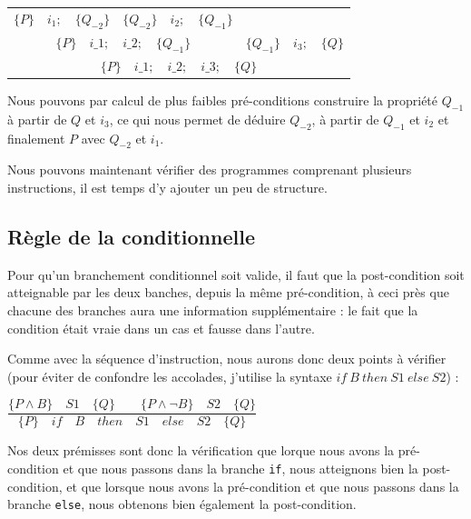 \documentclass[12pt,francais,]{scrbook}
\begin{document}
\begin{center}
\begin{tabular}{ccc}
  $\{P\}\quad i_1 ; \quad \{Q_{-2}\}$ & $\{Q_{-2}\}\quad i_2 ; \quad \{Q_{-1}\}$ & \\
  \cline{1-2}
  \multicolumn{2}{c}{$\{P\}\quad i\_1 ; \quad i\_2 ; \quad \{Q_{-1}\}$} & $\{Q_{-1}\} \quad i_3 ; \quad \{Q\}$\\
  \hline
  \multicolumn{3}{c}{$\{P\}\quad i\_1 ; \quad i\_2 ; \quad i\_3; \quad \{ Q \}$}
\end{tabular}
\end{center}

Nous pouvons par calcul de plus faibles pré-conditions construire la
propriété \(Q_{-1}\) à partir de \(Q\) et \(i_3\), ce qui nous permet de
déduire \(Q_{-2}\), à partir de \(Q_{-1}\) et \(i_2\) et finalement
\(P\) avec \(Q_{-2}\) et \(i_1\).

Nous pouvons maintenant vérifier des programmes comprenant plusieurs
instructions, il est temps d'y ajouter un peu de structure.

\subsection{Règle de la
conditionnelle}\label{ruxe8gle-de-la-conditionnelle}

Pour qu'un branchement conditionnel soit valide, il faut que la
post-condition soit atteignable par les deux banches, depuis la même
pré-condition, à ceci près que chacune des branches aura une information
supplémentaire : le fait que la condition était vraie dans un cas et
fausse dans l'autre.

Comme avec la séquence d'instruction, nous aurons donc deux points à
vérifier (pour éviter de confondre les accolades, j'utilise la syntaxe
\(if\ B\ then\ S1\ else\ S2\)) :

\begin{center}
\(\dfrac{\{P \wedge B\}\quad S1\quad \{Q\} \quad \quad \{P \wedge \neg B\}\quad S2\quad \{Q\}}{\{P\}\quad if\quad B\quad then\quad S1\quad else\quad S2 \quad \{Q\}}\)
\end{center}

Nos deux prémisses sont donc la vérification que lorque nous avons la
pré-condition et que nous passons dans la branche \texttt{if}, nous
atteignons bien la post-condition, et que lorsque nous avons la
pré-condition et que nous passons dans la branche \texttt{else}, nous
obtenons bien également la post-condition.
\end{document}
